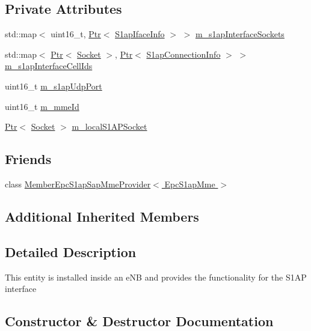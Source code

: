 \subsection*{Private Attributes}
\begin{DoxyCompactItemize}
\item 
std\+::map$<$ uint16\+\_\+t, \hyperlink{classns3_1_1Ptr}{Ptr}$<$ \hyperlink{classns3_1_1S1apIfaceInfo}{S1ap\+Iface\+Info} $>$ $>$ \hyperlink{classns3_1_1EpcS1apMme_a415a57f1b3b88750ecf99e6bf3187476}{m\+\_\+s1ap\+Interface\+Sockets}
\item 
std\+::map$<$ \hyperlink{classns3_1_1Ptr}{Ptr}$<$ \hyperlink{classns3_1_1Socket}{Socket} $>$, \hyperlink{classns3_1_1Ptr}{Ptr}$<$ \hyperlink{classns3_1_1S1apConnectionInfo}{S1ap\+Connection\+Info} $>$ $>$ \hyperlink{classns3_1_1EpcS1apMme_a99a04332eff0f80beb198bba9612871d}{m\+\_\+s1ap\+Interface\+Cell\+Ids}
\item 
uint16\+\_\+t \hyperlink{classns3_1_1EpcS1apMme_a5e2c2bf88a5bab4629e9b38ccdf48e53}{m\+\_\+s1ap\+Udp\+Port}
\item 
uint16\+\_\+t \hyperlink{classns3_1_1EpcS1apMme_aec351eb8823abfff5cd257d1d47769f1}{m\+\_\+mme\+Id}
\item 
\hyperlink{classns3_1_1Ptr}{Ptr}$<$ \hyperlink{classns3_1_1Socket}{Socket} $>$ \hyperlink{classns3_1_1EpcS1apMme_ac6fd7b6db143acc64d001a9fec7b0f3f}{m\+\_\+local\+S1\+A\+P\+Socket}
\end{DoxyCompactItemize}
\subsection*{Friends}
\begin{DoxyCompactItemize}
\item 
class \hyperlink{classns3_1_1EpcS1apMme_a596b2bed061bf70c49b9c82345f3d318}{Member\+Epc\+S1ap\+Sap\+Mme\+Provider$<$ Epc\+S1ap\+Mme $>$}
\end{DoxyCompactItemize}
\subsection*{Additional Inherited Members}


\subsection{Detailed Description}
This entity is installed inside an e\+NB and provides the functionality for the S1\+AP interface 

\subsection{Constructor \& Destructor Documentation}
